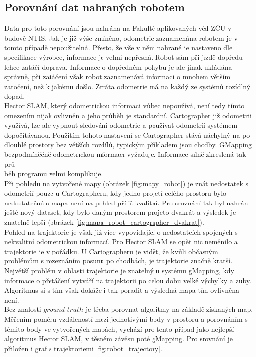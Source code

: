 \documentclass[12pt]{report}
\begin{document}
\subsection{Porovnání dat nahraných robotem} \label{sekce:data_robot}
Data pro toto porovnání jsou nahrána na Fakultě aplikovaných věd ZČU v budově NTIS. Jak je již výše zmíněno, odometrie zaznamenána robotem je v tomto případě nepoužitelná. Přesto, že vše v něm nahrané je nastaveno dle specifikace výrobce, informace je velmi nepřesná. Robot sám při jízdě dopředu lehce zatáčí doprava. Informace o dopředném pohybu je ale jinak ukládána správně, při zatáčení však robot zaznamenává informaci o mnohem větším zatočení, než k jakému došlo. Ztráta odometrie má na každý ze systémů rozídlný dopad.\\
\indent Hector SLAM, který odometrickou informaci vůbec nepoužívá, není tedy tímto omezením nijak ovlivněn a jeho průběh je standardní. Cartographer již odometrii využívá, lze ale vypnout sledování odometrie a používat odometrii systémem dopočítávanou. Použitím tohoto nastavení se Cartographer stává náchylný na po-\\dlouhlé prostory bez větších rozdílů, typickým příkladem jsou chodby. GMapping bezpodmíněčně odometrickou informaci vyžaduje. Informace silně zkreslená tak prů-\\běh programu velmi komplikuje.\\
\indent Při pohledu na vytvořené mapy (obrázek \ref{fig:mapy_robot}) je znát nedostatek s odometrií pouze u Cartographeru, kdy jedno projetí celého prostoru bylo nedostatečné a mapa není na pohled příliš kvalitní. Pro srovnání tak byl nahrán ještě nový dataset, kdy bylo daným prostorem projeto dvakrát a výsledek je znatelně lepší (obrázek \ref{fig:mapa_robot_cartographer_dvakrat}).\\
\indent Pohled na trajektorie je však již více vypovídající o nedostatcích spojených s nekvalitní odometrickou informací. Pro Hector SLAM se opět nic neměnilo a trajektorie je v pořádku. U Cartographeru je vidět, že kvůli občasným problémům s rozeznáním posunu po chodbách, je trajektorie značně kratší. Největší problém v oblasti trajektorie je znatelný u systému gMapping, kdy informace o přetáčení vytváří na trajektorii po celou dobu velké výchylky a zuby. Algoritmus si s tím však dokáže i tak poradit a výsledná mapa tím ovlivněna není.\\
\indent Bez znalosti $ground$ $truth$ je třeba porovnat algoritmy na základě získaných map. Měřením poměru vzdáleností mezi jednotivými body v prostoru a porovnáním s těmito body ve vytvořených mapách, vychází pro tento případ jako nejlepší algoritmus Hector SLAM, v těsném závěsu poté gMapping. Pro srovnání je přiložen i graf s trajektoriemi \ref{fig:robot_trajectory}. 
\end{document}
